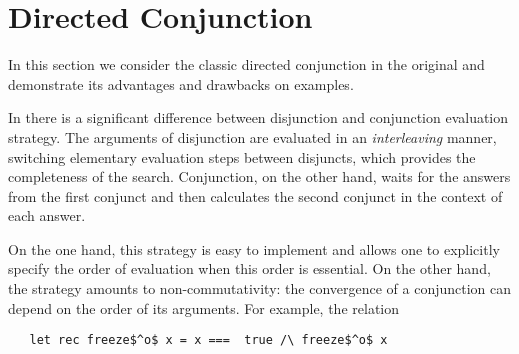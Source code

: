 \section{Directed Conjunction}
\label{sec:directed}

In this section we consider the classic directed conjunction in the original \mk and demonstrate its advantages and drawbacks on examples. 


In \mk there is a significant difference between disjunction and conjunction evaluation strategy. The arguments of disjunction are evaluated
in an \emph{interleaving} manner, switching elementary evaluation steps between disjuncts, which provides the completeness of the search.
Conjunction, on the other hand, waits for the answers from the first conjunct and then calculates the second conjunct in the context of each answer.

On the one hand, this strategy is easy to implement and allows one to explicitly specify the order of evaluation when this order is essential.
On the other hand, the strategy amounts to non-commutativity: the convergence of a conjunction can depend on the order of its arguments.
For example, the relation

\begin{lstlisting}
   let rec freeze$^o$ x = x ===  true /\ freeze$^o$ x
\end{lstlisting}

